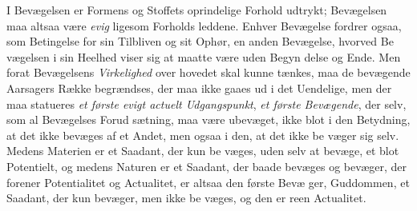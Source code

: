 \documentclass[12pt,a4paper]{book}
\begin{document}
I Bevægelsen er Formens og Stoffets oprindelige Forhold
udtrykt; Bevægelsen maa altsaa være \emph{evig} ligesom Forholds\-%
leddene. Enhver Bevægelse fordrer ogsaa, som Betingelse for
sin Tilbliven og sit Ophør, en anden Bevægelse, hvorved Be\-%
vægelsen i sin Heelhed viser sig at maatte være uden Begyn\-%
delse og Ende. Men forat Bevægelsens \emph{Virkelighed} over\-%
hovedet skal kunne tænkes, maa de bevægende Aarsagers Række
begrændses, der maa ikke gaaes ud i det Uendelige, men der
maa statueres \emph{et første evigt actuelt Udgangspunkt},
\emph{et første Bevægende}, der selv, som al Bevægelses Forud\-%
sætning, maa være ubevæget, ikke blot i den Betydning, at
det ikke bevæges af et Andet, men ogsaa i den, at det ikke be\-%
væger sig selv. Medens Materien er et Saadant, der kun be\-%
væges, uden selv at bevæge, et blot Potentielt, og medens
Naturen er et Saadant, der baade bevæges og bevæger, der
forener Potentialitet og Actualitet, er altsaa den første Bevæ\-%
ger, Guddommen, et Saadant, der kun bevæger, men ikke be\-%
væges, og den er reen Actualitet.
\end{document}
